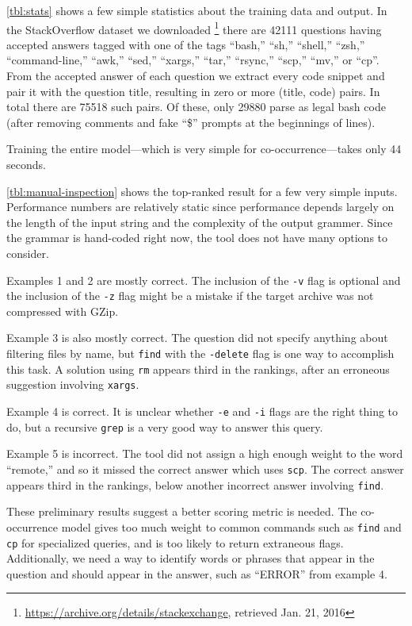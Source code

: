 \autoref{tbl:stats} shows a few simple statistics about the training data and
output. In the StackOverflow dataset we downloaded%
\footnote{\url{https://archive.org/details/stackexchange}, retrieved Jan. 21,
2016} there are 42111 questions having accepted answers tagged with one of the
tags ``bash,'' ``sh,'' ``shell,'' ``zsh,'' ``command-line,'' ``awk,'' ``sed,''
``xargs,'' ``tar,'' ``rsync,'' ``scp,'' ``mv,'' or ``cp''. From the accepted
answer of each question we extract every code snippet and pair it with the
question title, resulting in zero or more (title, code) pairs. In total there
are 75518 such pairs. Of these, only 29880 parse as legal bash code (after
removing comments and fake ``\$'' prompts at the beginnings of lines).

Training the entire model---which is very simple for co-occurrence---takes only
44 seconds.

\autoref{tbl:manual-inspection} shows the top-ranked result for a few very
simple inputs. Performance numbers are relatively static since performance
depends largely on the length of the input string and the complexity of the
output grammer. Since the grammar is hand-coded right now, the tool does not
have many options to consider.

Examples 1 and 2 are mostly correct. The inclusion of the \texttt{-v} flag is
optional and the inclusion of the \texttt{-z} flag might be a mistake if the
target archive was not compressed with GZip.

Example 3 is also mostly correct. The question did not specify anything about
filtering files by name, but \texttt{find} with the \texttt{-delete} flag is
one way to accomplish this task. A solution using \texttt{rm} appears third in
the rankings, after an erroneous suggestion involving \texttt{xargs}.

Example 4 is correct. It is unclear whether \texttt{-e} and \texttt{-i} flags
are the right thing to do, but a recursive \texttt{grep} is a very good way to
answer this query.

Example 5 is incorrect. The tool did not assign a high enough weight to the word
``remote,'' and so it missed the correct answer which uses \texttt{scp}. The
correct answer appears third in the rankings, below another incorrect answer
involving \texttt{find}.

These preliminary results suggest a better scoring metric is needed. The
co-occurrence model gives too much weight to common commands such as
\texttt{find} and \texttt{cp} for specialized queries, and is too likely to
return extraneous flags. Additionally, we need a way to identify words or
phrases that appear in the question and should appear in the answer, such as
``ERROR'' from example 4.

